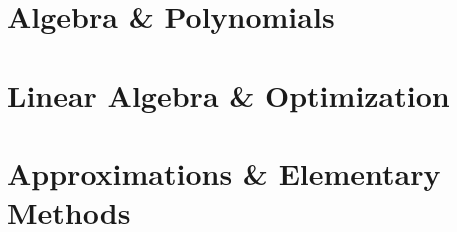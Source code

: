 \documentclass[a4paper]{article}
\begin{document}

\clearpage


\clearpage


\clearpage


\clearpage


\clearpage


\clearpage

\part{Algebra \& Polynomials}

\clearpage


\clearpage


\clearpage

\part{Linear Algebra \& Optimization}

\clearpage


\clearpage

\part{Approximations \& Elementary Methods}

\clearpage


\clearpage
\end{document}
